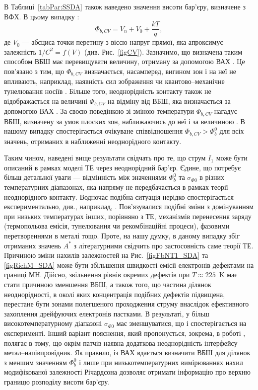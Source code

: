 В Таблиці~\ref{tabPar:SSDA} також наведено значення висоти бар'єру, визначене з ВФХ.
В цьому випадку  \cite{Rhoderick1988,Schroder2006}:
\begin{equation}\label{eqFbCV}
\Phi_{b,CV}=V_n+V_0+\frac{kT}{q},
\end{equation}
де
$V_0$ --- абсциса точки перетину з віссю напруг прямої, яка апроксимує залежність $1/C^2=f(V)$ (див. Рис.~\ref{figCV}).
Зазначимо, що визначена таким способом ВБШ має перевищувати величину, отриману за допомогою ВАХ
\cite{Rhoderick1988,GELCZUK2014,Mohan,Cetin2005,Soylu,Yildirim2010,Karatas:2006NIMA}.
Це пов'язано з тим, що $\Phi_{b,CV}$ визначається, насамперед, вигином зон і на неї не впливають, наприклад,
наявність сил зображення чи квантово--механічне тунелювання носіїв \cite{Rhoderick1988,GELCZUK2014,Mohan}.
Більше того, неоднорідність контакту також не відображається на величині $\Phi_{b,CV}$ на відміну від ВБШ,
яка визначається за допомогою ВАХ \cite{Sullivan,Tung:PhysRev,GELCZUK2014,Mohan}.
За своєю поведінкою зі зміною температури $\Phi_{b,CV}$ нагадує ВБШ, визначену за умов плоских зон, наближаючись
до неї і за величиною \cite{Cetin2005,Soylu,Yildirim2010,Mohan}.
В нашому випадку спостерігається очікуване співвідношення $\Phi_{b,CV}>\Phi_b^0$ для всіх значень, отриманих
в наближенні неоднорідного контакту.

Таким чином, наведені вище результати свідчать про те, що струм $I_1$ може бути описаний в рамках моделі ТЕ через неоднорідний бар'єр.
Єдине, що потребує більш детальної уваги --- відмінність між значеннями $\Phi_b^0$ та  $\sigma_{\Phi0}$ в різних температурних діапазонах,
яка напряму не передбачається в рамках теорії неоднорідного контакту.
Водночас подібна ситуація нерідко спостерігається експериментально, див., наприклад,
\cite{Tascioglu2010old,Yildirim2010,Mamor,Jiang:DGJap,JYOTHI2015,DURMUS2014,KHURE2015,OZAVCI2013,Tung:ApplPhysRev}.
Пов'язувалися подібні зміни  з домінуванням при низьких температурах інших, порівняно з ТЕ, механізмів перенесення заряду
(термопольова емісія, тунелювання чи рекомбінаційні процеси), фазовими перетвореннями в металі тощо.
Проте, на нашу думку, в даному випадку збіг  отриманих значень $A^*$ з літературними свідчить про застосовність саме теорії ТЕ.
Причиною зміни нахилів залежностей на Рис.~\ref{figFbNT1_SDA} та \ref{figRichM_SDA} може бути збільшення швидкості емісії електронів дефектами на границі МН.
Дійсно, звільнення рівнів окремих дефектів при $T\approx225$~K має стати причиною зменшення ВБШ, а також того,
що частина ділянок неоднорідності, в околі яких концентрація подібних дефектів підвищена, перестане бути зонами полегшеного проходження струму внаслідок ефективного захоплення дрейфуючих електронів пастками.
В результаті, у більш високотемпературному діапазоні $\sigma_{\Phi0}$ має зменшуватися, що і спостерігається на експерименті.
Інший варіант пояснення, який пропонується, зокрема, в роботі \cite{Tung:ApplPhysRev},
полягає в тому, що окрім патчів наявна додаткова неоднорідність інтерфейсу метал--напівпровідник.
Як правило, із ВАХ вдається визначити ВБШ для ділянок з меншим значенням $\Phi_b^0$ і лише при низькотемпературних вимірюваннях
нахил модифікованої залежності Річардсона дозволяє отримати інформацію про верхню границю розподілу висоти бар'єру.


